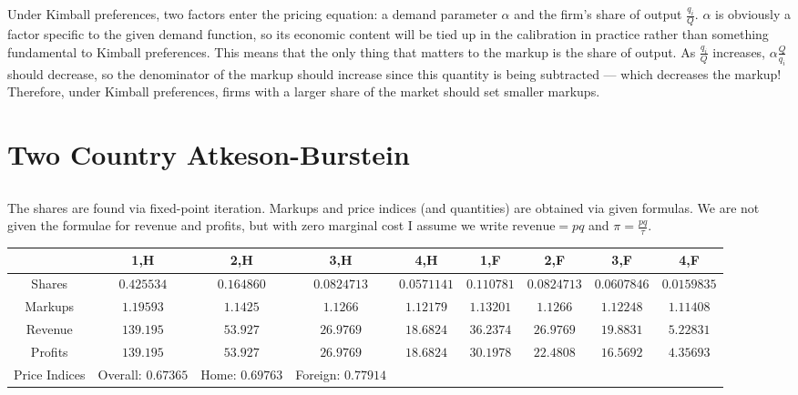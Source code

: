\documentclass[12pt, letterpaper]{article}
\begin{document}
    \subsection{}

    Under Kimball preferences, two factors enter the pricing equation: a demand parameter \(\alpha\) and the firm's share of output \(\frac{q_i}{Q}\). \(\alpha\) is obviously a factor specific to the given demand function, so its economic content will be tied up in the calibration in practice rather than something fundamental to Kimball preferences. This means that the only thing that matters to the markup is the share of output. As \(\frac{q_i}{Q}\) increases, \(\alpha \frac{Q}{q_i}\) should decrease, so the denominator of the markup should increase since this quantity is being subtracted --- which decreases the markup! Therefore, under Kimball preferences, firms with a larger share of the market should set smaller markups.



    \section{Two Country Atkeson-Burstein}

    \subsection{}

    The shares are found via fixed-point iteration. Markups and price indices (and quantities) are obtained via given formulas. We are not given the formulae for revenue and profits, but with zero marginal cost I assume we write \(\text{revenue} = pq\) and \(\pi = \frac{pq}{\tau}\).

    \begin{adjustbox}{angle=90}
    \begin{tabular}{|c|c|c|c|c|c|c|c|c|}
        \hline
        & 1,H & 2,H & 3,H & 4,H & 1,F & 2,F & 3,F & 4,F \\
        \hline
        Shares & \(0.425534\) & \(0.164860\) & \(0.0824713\) & \(0.0571141\) & \(0.110781\) & \(0.0824713\) & \(0.0607846\) & \(0.0159835\) \\
        \hline
        Markups & \(1.19593\) & \(1.1425\) & \(1.1266\) & \(1.12179\) & \(1.13201\) & \(1.1266\) & \(1.12248\) & \(1.11408\) \\
        \hline
        Revenue & \(139.195\) & \(53.927\) & \(26.9769\) & \(18.6824\) & \(36.2374\) & \(26.9769\) & \(19.8831\) & \(5.22831\) \\
        \hline
        Profits & \(139.195\) & \(53.927\) & \(26.9769\) & \(18.6824\) & \(30.1978\) & \(22.4808\) & \(16.5692\) & \(4.35693\) \\
        \hline
        Price Indices & Overall: \(0.67365\) & Home: \(0.69763\) & Foreign: \(0.77914\) & & & & & \\
        \hline
    
    \end{tabular}
    \end{adjustbox}
\end{document}
